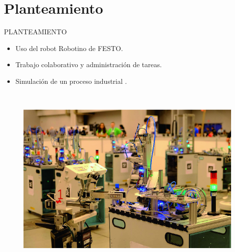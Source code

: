 \documentclass[handout,t]{beamer}
\begin{document}
\section{Planteamiento}
\begin{frame}{PLANTEAMIENTO}
\begin{itemize}
    \item Uso del robot Robotino de FESTO.
    \item Trabajo colaborativo y administración de tareas.
    \item Simulación de un proceso industrial \cite{robocup__mathworks_robocup_2022}.
\end{itemize}
\phantom{sd}\\
\begin{figure}[htp]
    \centering
    \includegraphics[scale=0.35]{NewFigures/RC_Logistics.png}
    \label{fig:Robocup}
\end{figure}
\end{frame}
\end{document}
